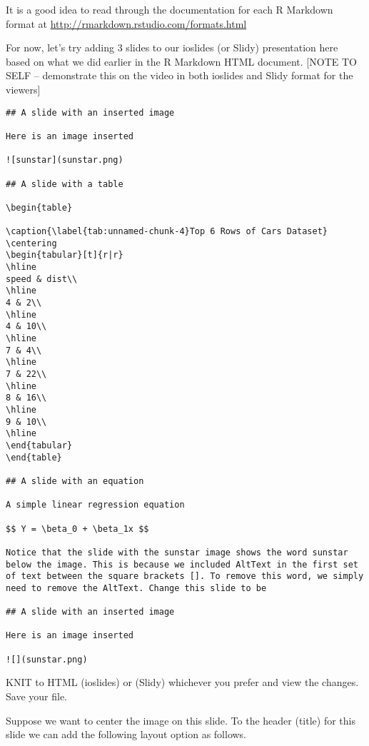 \documentclass[
]{book}
\begin{document}
It is a good idea to read through the documentation for each R Markdown format at \url{http://rmarkdown.rstudio.com/formats.html}

For now, let's try adding 3 slides to our ioslides (or Slidy) presentation here based on what we did earlier in the R Markdown HTML document. {[}NOTE TO SELF -- demonstrate this on the video in both ioslides and Slidy format for the viewers{]}

\begin{verbatim}
## A slide with an inserted image

Here is an image inserted

![sunstar](sunstar.png)

## A slide with a table

\begin{table}

\caption{\label{tab:unnamed-chunk-4}Top 6 Rows of Cars Dataset}
\centering
\begin{tabular}[t]{r|r}
\hline
speed & dist\\
\hline
4 & 2\\
\hline
4 & 10\\
\hline
7 & 4\\
\hline
7 & 22\\
\hline
8 & 16\\
\hline
9 & 10\\
\hline
\end{tabular}
\end{table}

## A slide with an equation

A simple linear regression equation

$$ Y = \beta_0 + \beta_1x $$

Notice that the slide with the sunstar image shows the word sunstar below the image. This is because we included AltText in the first set of text between the square brackets []. To remove this word, we simply need to remove the AltText. Change this slide to be

## A slide with an inserted image

Here is an image inserted

![](sunstar.png)
\end{verbatim}

KNIT to HTML (ioslides) or (Slidy) whichever you prefer and view the changes. Save your file.

Suppose we want to center the image on this slide. To the header (title) for this slide we can add the following layout option as follows.
\end{document}
